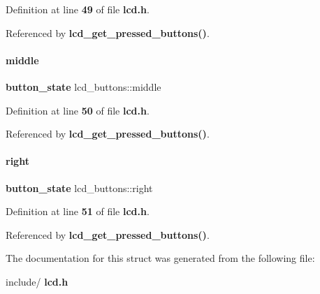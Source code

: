 Definition at line \textbf{ 49} of file \textbf{ lcd.\+h}.



Referenced by \textbf{ lcd\+\_\+get\+\_\+pressed\+\_\+buttons()}.

\mbox{\label{structlcd__buttons_a293342810ac56f73979b08f144d6e6b9}} 
\paragraph{middle}
{\footnotesize\ttfamily \textbf{ button\+\_\+state} lcd\+\_\+buttons\+::middle}



Definition at line \textbf{ 50} of file \textbf{ lcd.\+h}.



Referenced by \textbf{ lcd\+\_\+get\+\_\+pressed\+\_\+buttons()}.

\mbox{\label{structlcd__buttons_a2437d744e09ca1bb91ab4ca53ef77198}} 
\paragraph{right}
{\footnotesize\ttfamily \textbf{ button\+\_\+state} lcd\+\_\+buttons\+::right}



Definition at line \textbf{ 51} of file \textbf{ lcd.\+h}.



Referenced by \textbf{ lcd\+\_\+get\+\_\+pressed\+\_\+buttons()}.



The documentation for this struct was generated from the following file\+:\begin{DoxyCompactItemize}
\item 
include/\textbf{ lcd.\+h}\end{DoxyCompactItemize}
